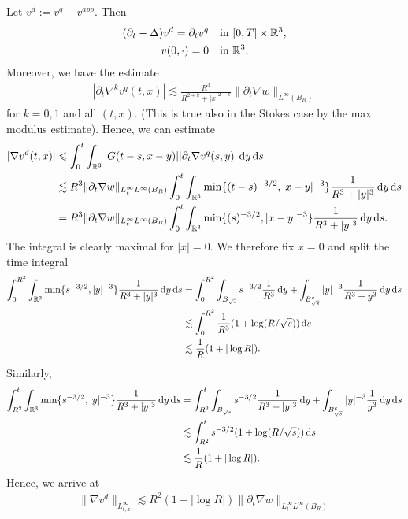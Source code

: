 \documentclass[abstracton, paper=a4, fontsize=11pt,DIV=12,bibliography=totoc]{scrartcl}
\begin{document}
Let $v^d := v^q - v^{app}$. Then 
\begin{align*}
    (\partial_t - \Delta)v^d = \partial_t v^q & \quad \text{in } [0,T] \times \mathbb{R}^3, \\
       v(0,\cdot) = 0 & \quad \text{in } \mathbb{R}^3.
\end{align*}
Moreover, we have the estimate
\begin{align*}
    |\partial_t \nabla^k v^q(t,x)| \lesssim \frac{R^3}{R^{2+k} +|x|^{2+k}} \|\partial_t \nabla w\|_{L^\infty(B_R)}
\end{align*}
for $k = 0,1$ and all $(t,x)$. (This is true also in the Stokes case by the max modulus estimate).
Hence, we can estimate
\begin{align*}
    |\nabla v^d(t,x)| &\leqslant \int_0^t \int_{\mathbb{R}^3} |G(t-s,x-y)| |\partial_t \nabla v^q(s,y)| \, \mathrm{d} y \, \mathrm{d} s \\
    & \lesssim R^3 \|\partial_t \nabla w\|_{L^\infty_t L^\infty(B_R)} \int_0^t \int_{\mathbb{R}^3} \min\{(t-s)^{-3/2}, |x-y|^{-3}\} \frac{1}{R^{3} +|y|^{3}}\, \mathrm{d} y \, \mathrm{d} s \\
    &=R^3 \|\partial_t \nabla w\|_{L^\infty_t L^\infty(B_R)} \int_0^t \int_{\mathbb{R}^3} \min\{(s)^{-3/2}, |x-y|^{-3}\} \frac{1}{R^{3} +|y|^{3}}\, \mathrm{d} y \, \mathrm{d} s.
\end{align*}
The integral is clearly maximal for $|x| = 0$. We therefore fix $x=0$ and split the time integral 
\begin{align*}
\int_0^{R^2} \int_{\mathbb{R}^3} \min\{s^{-3/2}, |y|^{-3}\} \frac{1}{R^{3} +|y|^{3}}\, \mathrm{d} y \, \mathrm{d} s & = \int_0^{R^2} \int_{B_{\sqrt s}} s^{-3/2}   \frac{1}{R^{3}} \, \mathrm{d} y + \int_{B_{\sqrt s}^c}|y|^{-3}  \frac{1}{R^{3} + y^3} \, \mathrm{d} y \, \mathrm{d} s\\
&\lesssim \int_0^{R^2} \frac{1}{R^{3}} (1+\log(R/\sqrt s)) \, \mathrm{d} s \\
& \lesssim \frac 1 R (1+ |\log R|).
\end{align*}
Similarly, 
\begin{align*}
\int_{R^2}^{t} \int_{\mathbb{R}^3} \min\{s^{-3/2}, |y|^{-3}\} \frac{1}{R^{3} +|y|^{3}}\, \mathrm{d} y \, \mathrm{d} s & = \int_{R^2}^{t} \int_{B_{\sqrt s}} s^{-3/2}   \frac{1}{R^{3} + |y|^3} \, \mathrm{d} y + \int_{B_{\sqrt s}^c}|y|^{-3}  \frac{1}{y^3} \, \mathrm{d} y \, \mathrm{d} s\\
&\lesssim \int_{R^2}^{t} s^{-3/2} (1+\log(R/\sqrt s)) \, \mathrm{d} s \\
& \lesssim \frac 1 R (1+ |\log R|).
\end{align*}
Hence, we arrive at 
\begin{align*}
    \|\nabla v^d\|_{L^\infty_{t,x}} \lesssim  R^2  (1+ |\log R|) \|\partial_t \nabla w\|_{L^\infty_t L^\infty(B_R)}
\end{align*}
\end{document}
